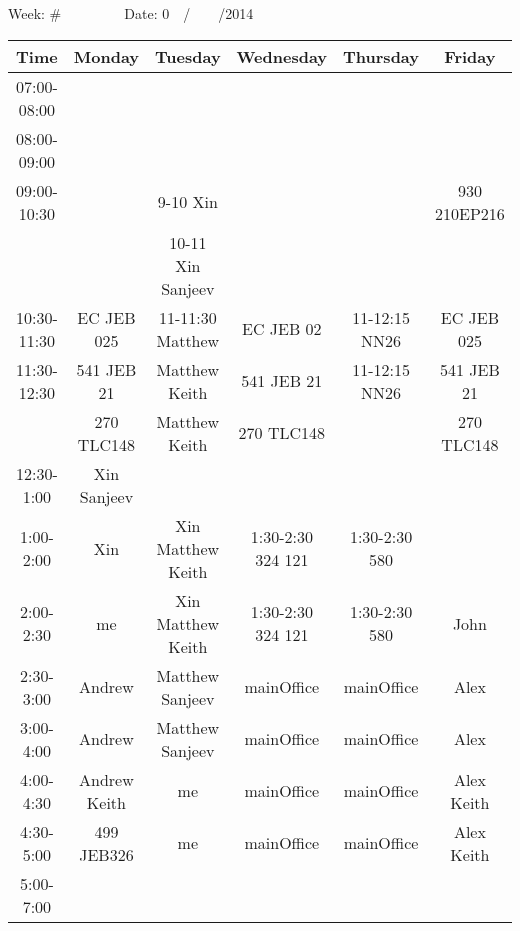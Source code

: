 \documentclass{article}  %
\begin{document}
\newpage
Week: \#\ \ \ \ \ \ \ \ \  Date: 0\ \ /\ \ \ \ /2014 \\
\begin{table}[!hbp]   %

\begin{tabular}{|c|c|c|c|c|c|}   %
\hline %
\hline %
Time        & Monday       & Tuesday           & Wednesday  & Thursday      & Friday \\
\hline
07:00-08:00 &              &                   &            &               &  \\
\hline
08:00-09:00 &              &                   &            &               &  \\
\hline
\hline
09:00-10:30 &              & 9-10 Xin          &            &               & 930 210EP216  \\
            &              & 10-11 Xin Sanjeev &            &               &  \\
\hline
10:30-11:30 & EC JEB 025   & 11-11:30 Matthew  & EC JEB 02  & 11-12:15 NN26 & EC JEB 025 \\
\hline
11:30-12:30 & 541 JEB 21   & Matthew Keith     & 541 JEB 21 & 11-12:15 NN26 & 541 JEB 21 \\
            & 270 TLC148   & Matthew Keith     & 270 TLC148 &               & 270 TLC148 \\
\hline
12:30-1:00  & Xin Sanjeev  &                   &            &               & \\
\hline
1:00-2:00   & Xin          & Xin Matthew Keith & 1:30-2:30 324 121 & 1:30-2:30 580 & \\
\hline
2:00-2:30   & me           & Xin Matthew Keith & 1:30-2:30 324 121 & 1:30-2:30 580 & John   \\
2:30-3:00   & Andrew       & Matthew Sanjeev   & mainOffice & mainOffice    & Alex   \\
\hline
3:00-4:00   & Andrew       & Matthew Sanjeev   & mainOffice & mainOffice    & Alex   \\
\hline
4:00-4:30   & Andrew Keith & me                & mainOffice & mainOffice    & Alex Keith\\
4:30-5:00   & 499 JEB326   & me                & mainOffice & mainOffice    & Alex Keith\\
\hline
\hline
5:00-7:00   &  &  &  &  & \\

\end{tabular}
\end{table}
\end{document}
